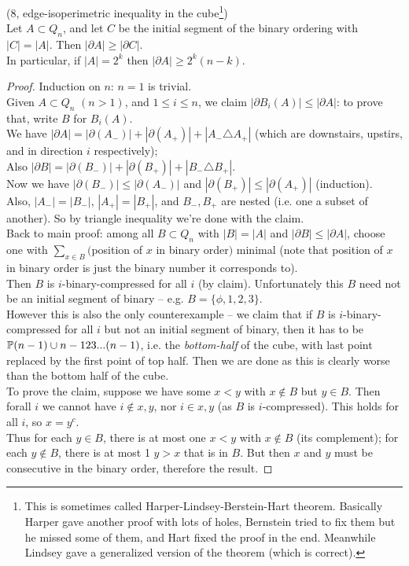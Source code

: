 \documentclass[a4paper]{article}
\begin{document}
\begin{thm} (8, edge-isoperimetric inequality in the cube\footnote{This is sometimes called Harper-Lindsey-Berstein-Hart theorem. Basically Harper gave another proof with lots of holes, Bernstein tried to fix them but he missed some of them, and Hart fixed the proof in the end. Meanwhile Lindsey gave a generalized version of the theorem (which is correct).})\\
    Let $A \subset Q_n$, and let $C$ be the initial segment of the binary ordering with $|C| = |A|$. Then $|\partial A| \geq |\partial C|$.\\
    In particular, if $|A| = 2^k$ then $|\partial A| \geq 2^k (n-k)$.
    \begin{proof}
        Induction on $n$: $n=1$ is trivial.\\
        Given $A \subset Q_n$ $(n>1)$, and $1 \leq i \leq n$, we claim $|\partial B_i(A)| \leq |\partial A|$: to prove that, write $B$ for $B_i(A)$.\\
        We have $|\partial A| = |\partial (A_-)| + |\partial (A_+)| + |A_- \triangle A_+|$ (which are downstairs, upstirs, and in direction $i$ respectively);\\
        Also $|\partial B| = |\partial(B_-)| + |\partial(B_+)| + |B_- \triangle B_+|$.\\
        Now we have $|\partial(B_-)| \leq |\partial(A_-)|$ and $|\partial(B_+)| \leq |\partial (A_+)|$ (induction).\\
        Also, $|A_-| = |B_-|$, $|A_+|=|B_+|$, and $B_-,B_+$ are nested (i.e. one a subset of another). So by triangle inequality we're done with the claim.\\

        Back to main proof: among all $B\subset Q_n$ with $|B| = |A|$ and $|\partial B| \leq |\partial A|$, choose one with $\sum_{x\in B}($position of $x$ in binary order$)$ minimal (note that position of $x$ in binary order is just the binary number it corresponds to).\\
        Then $B$ is $i$-binary-compressed for all $i$ (by claim). Unfortunately this $B$ need not be an initial segment of binary -- e.g. $B=\{\phi,1,2,3\}$.\\
        However this is also the only counterexample -- we claim that if $B$ is $i$-binary-compressed for all $i$ but not an initial segment of binary, then it has to be $\P(n-1) \cup n - 123...(n-1)$, i.e. the \emph{bottom-half} of the cube, with last point replaced by the first point of top half. Then we are done as this is clearly worse than the bottom half of the cube.\\
        To prove the claim, suppose we have some $x<y$ with $x \not\in B$ but $y\in B$. Then forall $i$ we cannot have $i \not\in x,y$, nor $i \in x,y$ (as $B$ is $i$-compressed). This holds for all $i$, so $x=y^c$.\\
        Thus for each $y \in B$, there is at most one $x<y$ with $x \not\in B$ (its complement); for each $y \not\in B$, there is at most 1 $y>x$ that is in $B$. But then $x$ and $y$ must be consecutive in the binary order, therefore the result.
    \end{proof}
\end{thm}
\end{document}

